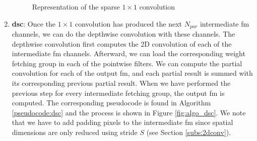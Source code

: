 \begin{enumerate}
\begin{figure}[H]
        \caption{Representation of the sparse $1 \times 1$ convolution}
        \label{fig:algo_11conv}
    \end{figure}
    \item \textbf{\acrshort{dsc}}: Once the $1 \times 1$ convolution has produced the next $N_{par}$ intermediate \acrshort{fm} channels, we can do the depthwise convolution with these channels. The depthwise convolution first computes the 2D convolution of each of the intermediate \acrshort{fm} channels. Afterward, we can load the corresponding weight fetching group in each of the pointwise filters. We can compute the partial convolution for each of the output \acrshort{fm}, and each partial result is summed with its corresponding previous partial result. When we have performed the previous step for every intermediate fetching group, the output \acrshort{fm} is computed. The corresponding pseudocode is found in Algorithm \ref{pseudocode:dsc} and the process is shown in Figure \ref{fig:algo_dsc}. We note that we have to add padding pixels to the intermediate \acrshort{fm} since spatial dimensions are only reduced using stride $S$ (see Section \ref{subs:2dconv}).
    \begin{algorithm}[H]
        \centering
        \begin{algorithmic}
             
                 
                     
                         
                             
                                     
                            \EndFor
                        \EndFor
                    \EndFor
                     
                         

\end{algorithmic}
\end{algorithm}
\end{enumerate}

